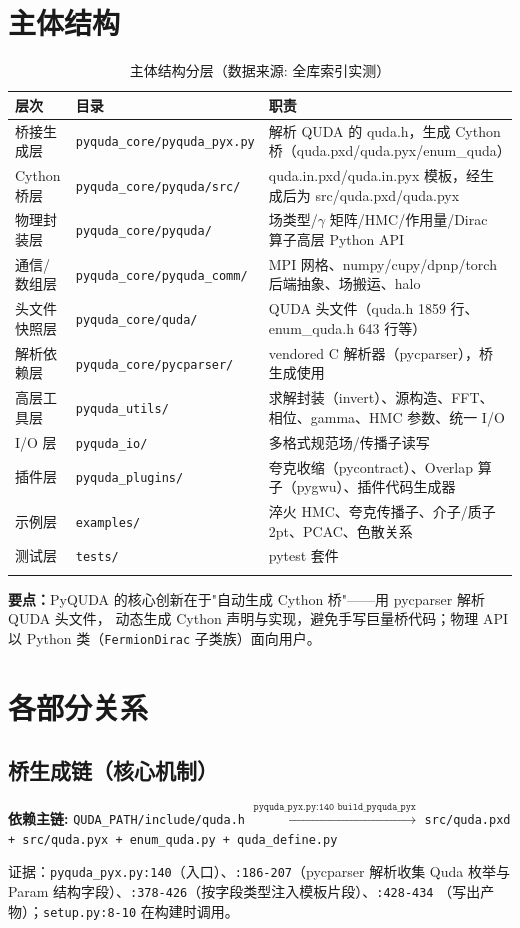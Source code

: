 \documentclass[UTF8]{ctexart}
\begin{document}
\section{主体结构}
\begin{xltabular}{\textwidth}{lXX}
\toprule
\textcolor{struct}{层次} & 目录 & \textcolor{struct}{职责} \\
\midrule
\endhead
桥接生成层 & \texttt{pyquda\_core/pyquda\_pyx.py} & 解析 QUDA 的 quda.h，生成 Cython 桥（quda.pxd/quda.pyx/enum\_quda）\\
Cython 桥层 & \texttt{pyquda\_core/pyquda/src/} & quda.in.pxd/quda.in.pyx 模板，经生成后为 src/quda.pxd/quda.pyx \\
物理封装层 & \texttt{pyquda\_core/pyquda/} & 场类型/$\gamma$ 矩阵/HMC/作用量/Dirac 算子高层 Python API \\
通信/数组层 & \texttt{pyquda\_core/pyquda\_comm/} & MPI 网格、numpy/cupy/dpnp/torch 后端抽象、场搬运、halo \\
头文件快照层 & \texttt{pyquda\_core/quda/} & QUDA 头文件（quda.h 1859 行、enum\_quda.h 643 行等）\\
解析依赖层 & \texttt{pyquda\_core/pycparser/} & vendored C 解析器（pycparser），桥生成使用 \\
高层工具层 & \texttt{pyquda\_utils/} & 求解封装（invert）、源构造、FFT、相位、gamma、HMC 参数、统一 I/O \\
I/O 层 & \texttt{pyquda\_io/} & 多格式规范场/传播子读写 \\
插件层 & \texttt{pyquda\_plugins/} & 夸克收缩（pycontract）、Overlap 算子（pygwu）、插件代码生成器 \\
示例层 & \texttt{examples/} & 淬火 HMC、夸克传播子、介子/质子 2pt、PCAC、色散关系 \\
测试层 & \texttt{tests/} & pytest 套件 \\
\bottomrule
\caption{主体结构分层（数据来源: 全库索引实测）}
\end{xltabular}

\begin{keybox}
\textbf{要点：}PyQUDA 的核心创新在于"自动生成 Cython 桥"——用 pycparser 解析 QUDA 头文件，
动态生成 Cython 声明与实现，避免手写巨量桥代码；物理 API 以 Python 类（\texttt{FermionDirac}
子类族）面向用户。
\end{keybox}

\section{各部分关系}

\subsection{桥生成链（核心机制）}
\begin{keybox}
\textbf{依赖主链:} \textcolor{relation}{\texttt{QUDA\_PATH/include/quda.h}
$\xrightarrow{\texttt{pyquda\_pyx.py:140 build\_pyquda\_pyx}}$
\texttt{src/quda.pxd + src/quda.pyx + enum\_quda.py + quda\_define.py}}
\end{keybox}
证据：\texttt{pyquda\_pyx.py:140}（入口）、\texttt{:186-207}（pycparser 解析收集 Quda 枚举与
Param 结构字段）、\texttt{:378-426}（按字段类型注入模板片段）、\texttt{:428-434}
（写出产物）；\texttt{setup.py:8-10} 在构建时调用。
\end{document}
